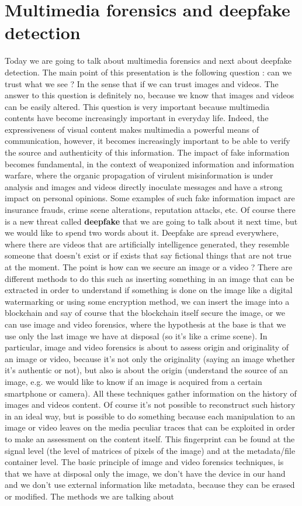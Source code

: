 \documentclass[11pt]{article}
\begin{document}
\section{Multimedia forensics and deepfake detection}
Today we are going to talk about multimedia forensics and next about deepfake detection. The main point of this presentation is the following question : can we trust what we see ? In the sense that if we can trust images and videos. The answer to this question is definitely no, because we know that images and videos can be easily altered. This question is very important because multimedia contents have become increasingly important in everyday life. Indeed, the expressiveness of visual content makes multimedia a powerful means of communication, however, it becomes increasingly important to be able to verify the source and authenticity of this information. The impact of fake information becomes fundamental, in the context of weaponized information and information warfare, where the organic propagation of virulent misinformation is under analysis and images and videos directly inoculate messages and have a strong impact on personal opinions. Some examples of such fake information impact are insurance frauds, crime scene alterations, reputation attacks, etc. Of course there is a new threat called \textbf{deepfake} that we are going to talk about it next time, but we would like to spend two words about it. Deepfake are spread everywhere, where there are videos that are artificially intelligence generated, they resemble someone that doesn't exist or if exists that say fictional things that are not true at the moment. The point is how can we secure an image or a video ? There are different methods to do this such as inserting something in an image that can be extracted in order to understand if something is done on the image like a digital watermarking or using some encryption method, we can insert the image into a blockchain and say of course that the blockchain itself secure the image, or we can use image and video forensics, where the hypothesis at the base is that we use only the last image we have at disposal (so it's like a crime scene). In particular, image and video forensics is about to assess origin and originality of an image or video, because it's not only the originality (saying an image whether it's authentic or not), but also is about the origin (understand the source of an image, e.g. we would like to know if an image is acquired from a certain smartphone or camera). All these techniques gather information on the history of images and videos content. Of course it's not possible to reconstruct such history in an ideal way, but is possible to do something because each manipulation to an image or video leaves on the media peculiar traces that can be exploited in order to make an assessment on the content itself. This fingerprint can be found at the signal level (the level of matrices of pixels of the image) and at the metadata/file container level. The basic principle of image and video forensics techniques, is that we have at disposal only the image, we don't have the device in our hand and we don't use external information like metadata, because they can be erased or modified. The methods we are talking about 
\end{document}
